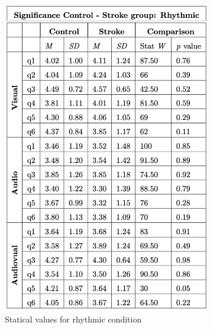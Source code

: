 \begin{figure}[htbp]
    \centering
    \begin{subfigure}[htbp]{0.31\textwidth}
        \centering
        \includegraphics[width=\textwidth]{significance_tables/significance_control_pop.png}
        \caption{Statical values for rhythmic condition}
        \label{fig: significance_pop_rhythmic} 
    \end{subfigure} 
    \begin{subfigure}[htbp]{0.327\textwidth}
        \centering

\end{subfigure}
\end{figure}

